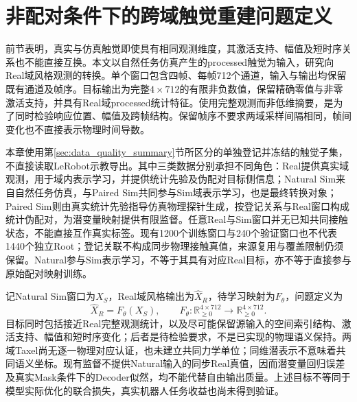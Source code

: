 \section{非配对条件下的跨域触觉重建问题定义}
\label{sec:ch05_unpaired_problem}

前节表明，真实与仿真触觉即使具有相同观测维度，其激活支持、幅值及短时序关系也不能直接互换。本文以自然任务仿真产生的processed触觉为输入，研究向Real域风格观测的转换。单个窗口包含四帧、每帧712个通道，输入与输出均保留既有通道及帧序。目标输出为完整$4\times712$的有限非负数值，保留精确零值与非零激活支持，并具有Real域processed统计特征。使用完整观测而非低维摘要，是为了同时检验响应位置、幅值及跨帧结构。保留帧序不要求两域采样间隔相同，帧间变化也不直接表示物理时间导数。

本章使用第\ref{sec:data_quality_summary}节所区分的单独登记并冻结的触觉子集，不直接读取LeRobot示教导出。其中三类数据分别承担不同角色：Real提供真实域观测，用于域内表示学习，并提供统计先验及伪配对目标侧信息；Natural Sim来自自然任务仿真，与Paired Sim共同参与Sim域表示学习，也是最终转换对象；Paired Sim则由真实统计先验指导仿真物理探针生成，按登记关系与Real窗口构成统计伪配对，为潜变量映射提供有限监督。任意Real与Sim窗口并无已知共同接触状态，不能直接互作真实标签。现有1200个训练窗口与240个验证窗口也不代表1440个独立Root；登记关联不构成同步物理接触真值，来源复用与覆盖限制仍须保留。Natural参与Sim表示学习，不等于其具有对应Real目标，亦不等于直接参与原始配对映射训练。

记Natural Sim窗口为$X_S$，Real域风格输出为$\widehat X_R$，待学习映射为$F_\theta$，问题定义为
\begin{equation}
 \widehat X_R=F_\theta(X_S),\qquad
 F_\theta:\mathbb R_{\geq0}^{4\times712}
 \rightarrow\mathbb R_{\geq0}^{4\times712}.
 \label{eq:ch05_unpaired_mapping}
\end{equation}
目标同时包括接近Real完整观测统计，以及尽可能保留源输入的空间索引结构、激活支持、幅值和短时序变化；后者是待检验要求，不是已实现的物理语义保持。两域Taxel尚无逐一物理对应认证，也未建立共同力学单位；同维潜表示不意味着共同语义坐标。现有监督不提供Natural输入的同步Real真值，因而潜变量回归误差及真实Mask条件下的Decoder似然，均不能代替自由输出质量。上述目标不等同于模型实际优化的联合损失，真实机器人任务收益也尚未得到验证。

